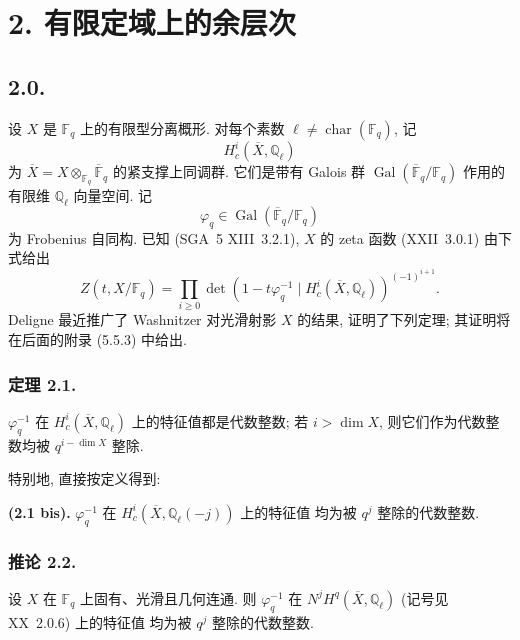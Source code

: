\section*{2. 有限定域上的余层次}

\subsection*{2.0.}
设 $X$ 是 $\mathbb F_q$ 上的有限型分离概形. 对每个素数
$\ell\ne\operatorname{char}(\mathbb F_q)$, 记
\begin{equation}\tag{2.0.1}
H_c^i(\overline X,\mathbb Q_\ell)
\end{equation}
为 $\overline X=X\otimes_{\mathbb F_q}\overline{\mathbb F}_q$ 的紧支撑上同调群.
它们是带有 Galois 群 $\operatorname{Gal}(\overline{\mathbb F}_q/\mathbb F_q)$ 作用的
有限维 $\mathbb Q_\ell$ 向量空间. 记
\begin{equation}\tag{2.0.2}
\varphi_q\in\operatorname{Gal}(\overline{\mathbb F}_q/\mathbb F_q)
\end{equation}
为 Frobenius 自同构. 已知 (SGA~5 XIII~3.2.1), $X$ 的 zeta 函数 (XXII~3.0.1) 由下式给出
\begin{equation}\tag{2.0.3}
Z(t,X/\mathbb F_q)=
\prod_{i\geq0}
\det\!\left(1-t\varphi_q^{-1}\mid
H_c^i(\overline X,\mathbb Q_\ell)\right)^{(-1)^{i+1}}.
\end{equation}
Deligne 最近推广了 Washnitzer 对光滑射影 $X$ 的结果, 证明了下列定理;
其证明将在后面的附录 (5.5.3) 中给出.

\subsubsection*{定理 2.1.}
$\varphi_q^{-1}$ 在 $H_c^i(\overline X,\mathbb Q_\ell)$ 上的特征值都是代数整数;
若 $i>\dim X$, 则它们作为代数整数均被 $q^{i-\dim X}$ 整除.

特别地, 直接按定义得到:

\medskip
\noindent\textbf{(2.1 bis).}
$\varphi_q^{-1}$ 在 $H_c^i(\overline X,\mathbb Q_\ell(-j))$ 上的特征值
均为被 $q^j$ 整除的代数整数.

\subsubsection*{推论 2.2.}
设 $X$ 在 $\mathbb F_q$ 上固有、光滑且几何连通. 则 $\varphi_q^{-1}$ 在
$N^jH^q(\overline X,\mathbb Q_\ell)$ (记号见 XX~2.0.6) 上的特征值
均为被 $q^j$ 整除的代数整数.

